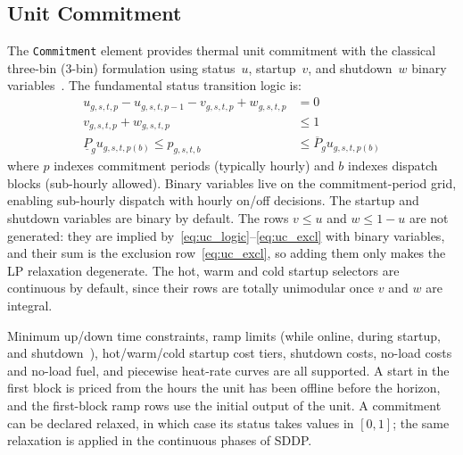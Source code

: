 \subsection{Unit Commitment}
\label{sec:uc}

The \texttt{Commitment} element provides thermal unit commitment with
the classical three-bin (3-bin) formulation using status~$u$,
startup~$v$, and shutdown~$w$ binary
variables~\cite{moralesespana2013tight,knueven2020}.  The fundamental status
transition logic is:
\begin{align}
u_{g,s,t,p} - u_{g,s,t,p-1} - v_{g,s,t,p} + w_{g,s,t,p}
  &= 0
  \label{eq:uc_logic} \\
v_{g,s,t,p} + w_{g,s,t,p}
  &\leq 1
  \label{eq:uc_excl} \\
\underline{P}_g u_{g,s,t,p(b)}
  \leq p_{g,s,t,b}
  &\leq \overline{P}_g u_{g,s,t,p(b)}
  \label{eq:uc_bounds}
\end{align}
where $p$ indexes commitment periods (typically hourly) and $b$ indexes
dispatch blocks (sub-hourly allowed).  Binary variables live on the
commitment-period grid, enabling sub-hourly dispatch with hourly on/off
decisions.  The startup and shutdown variables are binary by default.
The rows $v \leq u$ and $w \leq 1 - u$ are not generated: they are
implied by~\eqref{eq:uc_logic}--\eqref{eq:uc_excl} with binary
variables, and their sum is the exclusion row~\eqref{eq:uc_excl}, so
adding them only makes the LP relaxation degenerate.  The hot, warm and
cold startup selectors are continuous by default, since their rows are
totally unimodular once $v$ and $w$ are integral.

Minimum up/down time constraints, ramp limits (while online, during
startup, and shutdown~\cite{moralesespana2013susd}), hot/warm/cold
startup cost tiers, shutdown
costs, no-load costs and no-load fuel, and piecewise heat-rate curves
are all supported.  A start in the first block is priced from the hours
the unit has been offline before the horizon, and the first-block ramp
rows use the initial output of the unit.  A commitment can be declared
relaxed, in which case its status takes values in $[0,1]$; the same
relaxation is applied in the continuous phases of SDDP.


